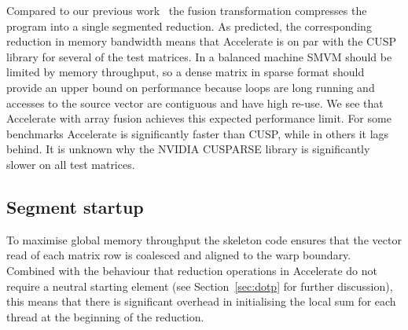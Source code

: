 Compared to our previous work~\cite{Chakravarty:2011fr} the fusion
transformation compresses the program into a single segmented reduction. As
predicted, the corresponding reduction in memory bandwidth means that Accelerate
is on par with the CUSP library for several of the test matrices. In a balanced
machine SMVM should be limited by memory throughput, so a dense matrix in
sparse format should provide an upper bound on performance because loops are
long running and accesses to the source vector are contiguous and have high
re-use. We see that Accelerate with array fusion achieves this expected
performance limit. For some benchmarks Accelerate is significantly faster than
CUSP, while in others it lags behind. It is unknown why the NVIDIA
CUSPARSE library is significantly slower on all test matrices.

\subsection{Segment startup}

To maximise global memory throughput the skeleton code ensures that the vector
read of each matrix row is coalesced and aligned to the warp boundary. Combined
with the behaviour that reduction operations in Accelerate do not require a
neutral starting element (see Section~\ref{sec:dotp} for further discussion),
this means that there is significant overhead in initialising the local sum for
each thread at the beginning of the reduction.


